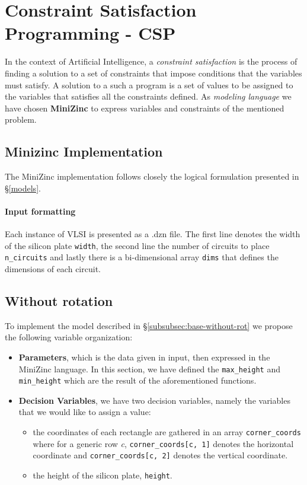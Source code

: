 \section{Constraint Satisfaction Programming - CSP}
In the context of Artificial Intelligence, a \textit{constraint satisfaction} is the process of finding a solution to a set of constraints that impose conditions that the variables must satisfy. A solution to a such a program is a set of values to be assigned to the variables that satisfies all the constraints defined. As \textit{modeling language} we have chosen \textbf{MiniZinc} to express variables and constraints of the mentioned problem.

\subsection{Minizinc Implementation}
The MiniZinc implementation follows closely the logical formulation presented in \S\ref{models}.

\paragraph{Input formatting}
Each instance of VLSI is presented as a .dzn file. The first line denotes the width of the silicon plate \texttt{width}, the second line the number of circuits to place \texttt{n\_circuits} and lastly there is a bi-dimensional array \texttt{dims} that defines the dimensions of each circuit.

\subsection{Without rotation}
To implement the model described in \S\ref{subsubsec:base-without-rot} we propose the following variable organization:
\begin{itemize}
    \item \textbf{Parameters}, which is the data given in input, then expressed in the MiniZinc language. In this section, we have defined the \texttt{max\_height} and \texttt{min\_height} which are the result of the aforementioned functions.
    \item \textbf{Decision Variables}, we have two decision variables, namely the variables that we would like to assign a value:
        \begin{itemize}
            \item the coordinates of each rectangle are gathered in an array \texttt{corner\_coords} where for a generic row \textit{c}, \texttt{corner\_coords[c, 1]} denotes the horizontal coordinate and \texttt{corner\_coords[c, 2]} denotes the vertical coordinate.
            \item the height of the silicon plate, \texttt{height}.
        \end{itemize}
\end{itemize}


